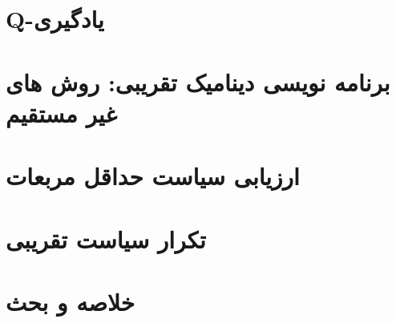 \documentclass[oneside, 11pt, a4paper]{book}
\begin{document}
\section{Q-یادگیری}\label{sec:8}

\section{برنامه نویسی دینامیک تقریبی: روش های غیر مستقیم}\label{sec:9}

\section{ارزیابی سیاست حداقل مربعات}\label{sec:10}

\section{تکرار سیاست تقریبی}\label{sec:11}

\section{خلاصه و بحث}\label{sec:12}
\end{document}
